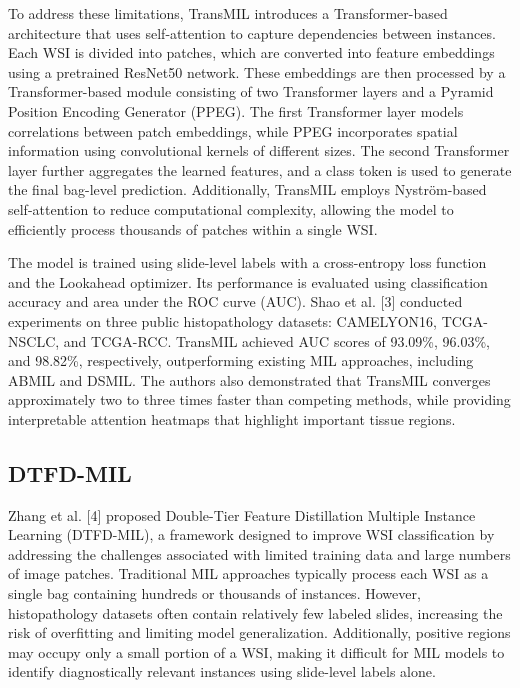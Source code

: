 \documentclass[journal]{IEEEtran}
\begin{document}
To address these limitations, TransMIL introduces a Transformer-based architecture that uses self-attention to capture dependencies between instances. Each WSI is divided into patches, which are converted into feature embeddings using a pretrained ResNet50 network. These embeddings are then processed by a Transformer-based module consisting of two Transformer layers and a Pyramid Position Encoding Generator (PPEG). The first Transformer layer models correlations between patch embeddings, while PPEG incorporates spatial information using convolutional kernels of different sizes. The second Transformer layer further aggregates the learned features, and a class token is used to generate the final bag-level prediction. Additionally, TransMIL employs Nyström-based self-attention to reduce computational complexity, allowing the model to efficiently process thousands of patches within a single WSI.

The model is trained using slide-level labels with a cross-entropy loss function and the Lookahead optimizer. Its performance is evaluated using classification accuracy and area under the ROC curve (AUC). Shao et al. [3] conducted experiments on three public histopathology datasets: CAMELYON16, TCGA-NSCLC, and TCGA-RCC. TransMIL achieved AUC scores of 93.09\%, 96.03\%, and 98.82\%, respectively, outperforming existing MIL approaches, including ABMIL and DSMIL. The authors also demonstrated that TransMIL converges approximately two to three times faster than competing methods, while providing interpretable attention heatmaps that highlight important tissue regions.

\subsection{DTFD-MIL}
Zhang et al. [4] proposed Double-Tier Feature Distillation Multiple Instance Learning (DTFD-MIL), a framework designed to improve WSI classification by addressing the challenges associated with limited training data and large numbers of image patches. Traditional MIL approaches typically process each WSI as a single bag containing hundreds or thousands of instances. However, histopathology datasets often contain relatively few labeled slides, increasing the risk of overfitting and limiting model generalization. Additionally, positive regions may occupy only a small portion of a WSI, making it difficult for MIL models to identify diagnostically relevant instances using slide-level labels alone.
\end{document}
